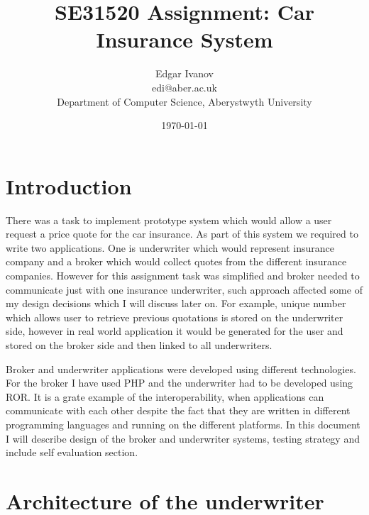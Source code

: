 \documentclass[10pt,a4paper,headinclude=true,twoside]{report}
\begin{document}
\title{SE31520 Assignment: Car Insurance System}
\author{Edgar Ivanov\\ edi@aber.ac.uk \\ Department of Computer Science, Aberystwyth University}
\date{\today}
\maketitle

\newpage
\thispagestyle{empty}
\mbox{}

\tableofcontents

\section{Introduction}
There was a task to implement prototype system which would allow a user request a price quote for the car insurance. As part of this system we required to write two applications. One is underwriter which would represent insurance company and a broker which would collect quotes from the different insurance companies. However for this assignment task was simplified and broker needed to communicate just with one insurance underwriter, such approach affected some of my design decisions which I will discuss later on. For example, unique number which allows user to retrieve previous quotations is stored on the underwriter side, however in real world application it would be generated for the user and stored on the broker side and then linked to all underwriters. 

Broker and underwriter applications were developed using different technologies. For the broker I have used PHP and the underwriter had to be developed using ROR. It is a grate example of the interoperability, when applications can communicate with each other despite the fact that they are written in different programming languages and running on the different platforms. In this document I will describe design of the broker and underwriter systems, testing strategy and include self evaluation section.  

\section{Architecture of the underwriter}


\end{document}
